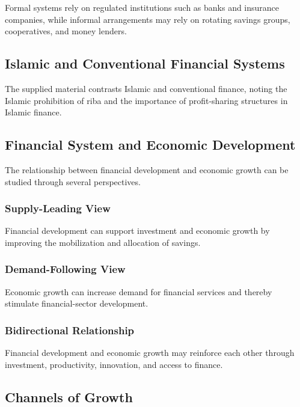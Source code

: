\documentclass[
]{article}
\begin{document}
Formal systems rely on regulated institutions such as banks and insurance companies, while informal arrangements may rely on rotating savings groups, cooperatives, and money lenders.

\subsection{Islamic and Conventional Financial Systems}\label{islamic-and-conventional-financial-systems}

The supplied material contrasts Islamic and conventional finance, noting the Islamic prohibition of riba and the importance of profit-sharing structures in Islamic finance.

\subsection{Financial System and Economic Development}\label{financial-system-and-economic-development}

The relationship between financial development and economic growth can be studied through several perspectives.

\subsubsection{Supply-Leading View}\label{supply-leading-view}

Financial development can support investment and economic growth by improving the mobilization and allocation of savings.

\subsubsection{Demand-Following View}\label{demand-following-view}

Economic growth can increase demand for financial services and thereby stimulate financial-sector development.

\subsubsection{Bidirectional Relationship}\label{bidirectional-relationship}

Financial development and economic growth may reinforce each other through investment, productivity, innovation, and access to finance.

\subsection{Channels of Growth}\label{channels-of-growth}
\end{document}

